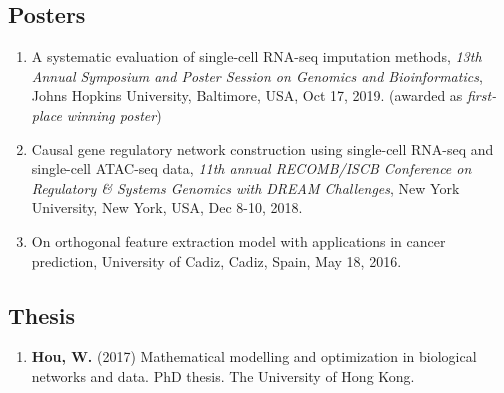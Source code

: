 \documentclass[10pt,letterpaper]{article}
\begin{document}
\subsection*{Posters}
\begin{enumerate}
\itemsep 0pt
\item A systematic evaluation of single-cell RNA-seq imputation methods, {\it 13th Annual Symposium and Poster Session on Genomics and Bioinformatics}, Johns Hopkins University, Baltimore, USA, Oct 17, 2019. (awarded as {\it first-place winning poster})
\item Causal gene regulatory network construction using single-cell RNA-seq and single-cell ATAC-seq data, {\it 11th annual RECOMB/ISCB Conference on Regulatory \& Systems Genomics  with DREAM Challenges}, New York University, New York, USA, Dec 8-10, 2018.
\item On orthogonal feature extraction model with applications in cancer prediction, University of Cadiz, Cadiz, Spain, May 18, 2016.
\end{enumerate}

\subsection*{Thesis}
\begin{enumerate}
\itemsep 0pt
\item {\bf Hou, W.} (2017) Mathematical modelling and optimization in biological networks and data. PhD thesis. The University of Hong Kong.
\end{enumerate}
\end{document}
